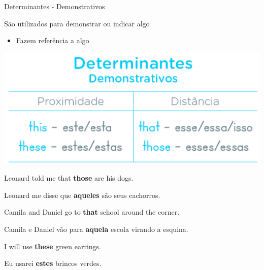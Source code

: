 \documentclass[compress,mathserif,xcolor=table]{beamer}
\begin{document}
\begin{frame}{Determinantes - Demonstrativos}

\begin{minipage}{.54\textwidth}
São utilizados para demonstrar ou indicar algo
\begin{itemize}
    \item Fazem referência a algo
\end{itemize}
\end{minipage}
\begin{minipage}{.44\textwidth}
\includegraphics[width=\linewidth]{images/determinantes_demonstrativos.png}
\end{minipage}

\vspace{0.5cm}

Leonard told me that \textbf{those} are his dogs.

Leonard me disse que \textbf{aqueles} são seus cachorros.

\vspace{0.2cm}

Camila and Daniel go to \textbf{that} school around the corner.

Camila e Daniel vão para \textbf{aquela} escola virando a esquina.

\vspace{0.2cm}

I will use \textbf{these} green earrings.

Eu usarei \textbf{estes} brincos verdes.

\end{frame}

\end{document}
